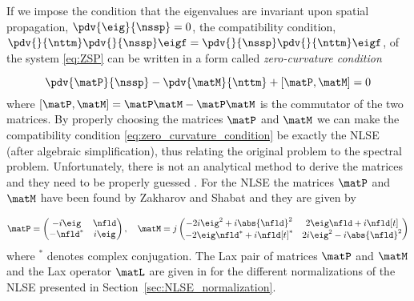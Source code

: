 If we impose the condition that the eigenvalues are invariant upon spatial
propagation, $\pdv{\eig}{\nssp} = 0$, the compatibility condition, $\pdv{}{\nttm}\pdv{}{\nssp}\eigf = \pdv{}{\nssp}\pdv{}{\nttm}\eigf$, of the
system \eqref{eq:ZSP} can be written in a form called
\textit{zero-curvature condition}~\cite{Yousefi2014}

\begin{equation}\label{eq:zero_curvature_condition}
  \pdv{\matP}{\nssp} - \pdv{\matM}{\nttm} + [\matP,\matM] = 0
\end{equation}
where $[\matP,\matM] = \matP\matM - \matP\matM$ is the commutator of the two
matrices.
By properly choosing the matrices $\matP$ and $\matM$ we can make the
compatibility condition \eqref{eq:zero_curvature_condition} be exactly the \ac{NLSE}
(after algebraic simplification), thus relating the original problem to the
spectral problem. Unfortunately, there is not an analytical method to derive the matrices
and they need to be properly guessed \cite{lax1968integrals}.
For the \ac{NLSE} the matrices $\matP$ and $\matM$ have been found by Zakharov and Shabat and they
are given by

\begin{align}\label{P.and.M}
  \matP =
    \begin{pmatrix}
      -i \eig & \nfld\\
      -\nfld^*     & i \eig\\
    \end{pmatrix}, \quad
  \matM = j
    \begin{pmatrix}
      -2 i \eig^2 + i \abs{ \nfld }^2 & 2 \eig \nfld + i \nfld[t]\\
      -2 \eig \nfld^* + i \nfld[t]^* & 2 i \eig^2 - i \abs{ \nfld }^2
    \end{pmatrix}
\end{align}
where $^*$ denotes complex conjugation.
The Lax pair of matrices $\matP$ and $\matM$ and the Lax operator $\matL$ are given in  for the different normalizations of the \ac{NLSE} presented in Section~\ref{sec:NLSE_normalization}.

%


